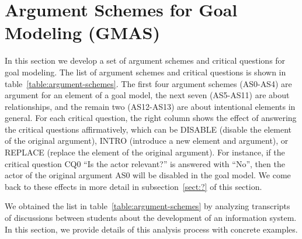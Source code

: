\section{Argument Schemes for Goal Modeling (GMAS)}
\label{sect:gmas}

In this section we develop a set of argument schemes and critical questions for goal modeling. The list of argument schemes and critical questions is shown in table~\ref{table:argument-schemes}. The first four argument schemes (AS0-AS4) are argument for an element of a goal model, the next seven (AS5-AS11) are about relationships, and the remain two (AS12-AS13) are about intentional elements in general. For each critical question, the right column shows the effect of answering the critical questions affirmatively, which can be DISABLE (disable the element of the original argument), INTRO (introduce a new element and argument), or REPLACE (replace the element of the original argument). For instance, if the critical question CQ0 ``Is the actor relevant?'' is answered with ``No'', then the actor of the original argument AS0 will be disabled in the goal model. We come back to these effects in more detail in subsection~\ref{sect:?} of this section.

We obtained the list in table~\ref{table:argument-schemes} by analyzing transcripts of discussions between students about the development of an information system. In this section, we provide details of this analysis process with concrete examples.

